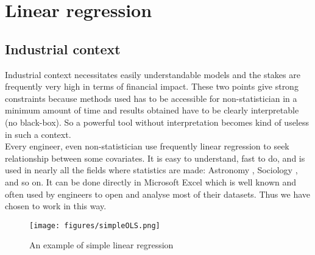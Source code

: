 \documentclass[12pt,a4paper]{report}
\begin{document}
	\section{Linear regression}
%			
		\subsection{Industrial context}
		
			Industrial context necessitates easily understandable models and the stakes are frequently very high in terms of financial impact. 
		These two points give strong constraints because methods used has to be accessible for non-statistician in a minimum amount of time and results obtained have to be clearly interpretable (no black-box). So a powerful tool without interpretation becomes kind of useless in such a context.\\
		
		Every engineer, even non-statistician use frequently linear regression to seek relationship between some covariates. It is easy to understand, fast to do, and is used in nearly all the fields where statistics are made\cite{montgomery2012introduction}: Astronomy \cite{isobe1990linear}, Sociology \cite{longford2012revision}, and so on. It can be done directly in Microsoft Excel which is well known and often used by engineers to open and analyse most of their datasets. Thus we have chosen to work in this way.\\
		 
\begin{figure}
\centering
	\texttt{[image: figures/simpleOLS.png]} 
	\caption{An example of simple linear regression}
\end{figure}		 
		 
\end{document}
